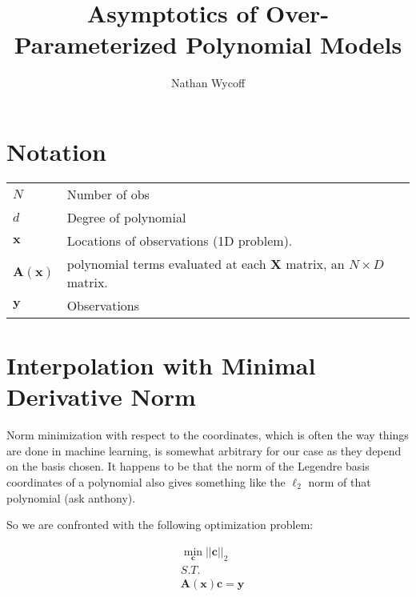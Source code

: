 \documentclass{article}
\title{Asymptotics of Over-Parameterized Polynomial Models}
\author{Nathan Wycoff}
\begin{document}
	\maketitle
	
	\section{Notation}
	
	\begin{table}[h]
		\begin{tabular}{ll}
			$N$ &Number of obs\\
			$d$ & Degree of polynomial\\
			$\mathbf{x}$ & Locations of observations (1D problem). \\
			$\mathbf{A}(\mathbf{x})$ & polynomial terms evaluated at each $\mathbf{X}$ matrix, an $N\times D$ matrix. \\
			$\mathbf{y}$ & Observations
		\end{tabular}
	\end{table}
	
	\section{Interpolation with Minimal Derivative Norm}
	
	Norm minimization with respect to the coordinates, which is often the way things are done in machine learning, is somewhat arbitrary for our case as they depend on the basis chosen. It happens to be that the norm of the Legendre basis coordinates of a polynomial also gives something like the $\ell_2$ norm of that polynomial (ask anthony).
	
	So we are confronted with the following optimization problem:
	
	\begin{align*}
		& \min_{\mathbf{c}} ||\mathbf{c}||_2 \\
		& S.T. \\
		& \mathbf{A}(\mathbf{x}) \mathbf{c} = \mathbf{y}
	\end{align*}
	
\end{document}
